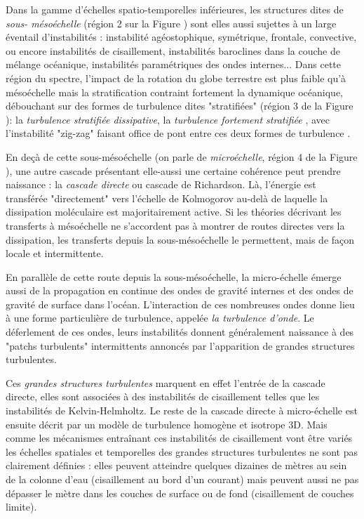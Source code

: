 Dans la gamme d'échelles spatio-temporelles inférieures, les structures dites de \textit{sous- mésoéchelle} (région 2 sur la Figure ) sont elles aussi sujettes à un large éventail d'instabilités \citep{mcwilliams_submesoscale_2016}: instabilité agéostophique, symétrique, frontale, convective, ou encore instabilités de cisaillement, instabilités baroclines dans la couche de mélange océanique, instabilités paramétriques des ondes internes... Dans cette région du spectre, l'impact de la rotation du globe terrestre est plus faible qu'à mésoéchelle mais la stratification contraint fortement la dynamique océanique, débouchant sur des formes de turbulence dites "stratifiées" (région 3 de la Figure ): la \textit{turbulence stratifiée dissipative}, la \textit{turbulence fortement stratifiée} \citep{augier_turbulence_2012}, avec l'instabilité "zig-zag" faisant office de pont entre ces deux formes de turbulence \citep{billant_zigzag_2010}.

En deçà de cette sous-mésoéchelle (on parle de \textit{microéchelle}, région 4 de la Figure ), une autre cascade présentant elle-aussi une certaine cohérence peut prendre naissance : la \textit{cascade directe} ou cascade de Richardson. Là, l'énergie est transférée "directement" vers l'échelle de Kolmogorov au-delà de laquelle la dissipation moléculaire est majoritairement active. Si les théories décrivant les transferts à mésoéchelle ne s'accordent pas à montrer de routes directes vers la dissipation, les transferts depuis la sous-mésoéchelle le permettent, mais de façon locale et intermittente.

En parallèle de cette route depuis la sous-mésoéchelle, la micro-échelle émerge aussi de la propagation en continue des ondes de gravité internes et des ondes de gravité de surface dans l'océan. L'interaction de ces nombreuses ondes donne lieu à une forme particulière de turbulence, appelée \textit{la turbulence d'onde}. Le déferlement de ces ondes, leurs instabilités donnent généralement naissance à des "patchs turbulents" intermittents annoncés par l'apparition de grandes structures turbulentes.

Ces \textit{grandes structures turbulentes} marquent en effet l'entrée de la cascade directe, elles sont associées à des instabilités de cisaillement telles que les instabilités de Kelvin-Helmholtz. Le reste de la cascade directe à micro-échelle est ensuite décrit par un modèle de turbulence homogène et isotrope 3D. Mais comme les mécanismes entraînant ces instabilités de cisaillement vont être variés les échelles spatiales et temporelles des grandes structures turbulentes ne sont pas clairement définies : elles peuvent atteindre quelques dizaines de mètres au sein de la colonne d'eau (cisaillement au bord d'un courant) mais peuvent aussi ne pas dépasser le mètre dans les couches de surface ou de fond (cisaillement de couches limite).

